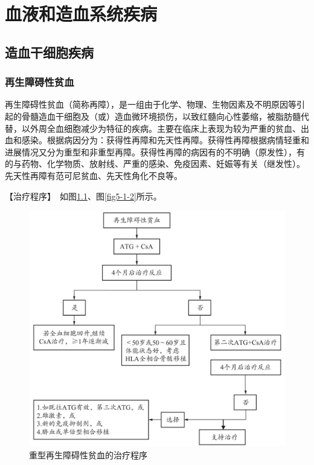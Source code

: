 \chapter{血液和造血系统疾病}

\section{造血干细胞疾病}

\subsection{再生障碍性贫血}

再生障碍性贫血（简称再障），是一组由于化学、物理、生物因素及不明原因等引起的骨髓造血干细胞及（或）造血微环境损伤，以致红髓向心性萎缩，被脂肪髓代替，以外周全血细胞减少为特征的疾病。主要在临床上表现为较为严重的贫血、出血和感染。根据病因分为：获得性再障和先天性再障。获得性再障根据病情轻重和进展情况又分为重型和非重型再障。获得性再障的病因有的不明确（原发性），有的与药物、化学物质、放射线、严重的感染、免疫因素、妊娠等有关（继发性）。先天性再障有范可尼贫血、先天性角化不良等。

【治疗程序】　如图\ref{fig5-1-1}、图\ref{fig5-1-2}所示。

\begin{figure}[!htbp]
 \centering
 \includegraphics{./images/Image00134.jpg}
 \captionsetup{justification=centering}
 \caption{重型再生障碍性贫血的治疗程序}
 \label{fig5-1-1}
  \end{figure} 

